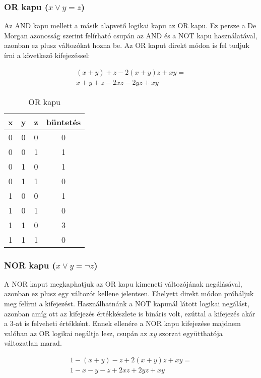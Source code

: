 \subsubsection{OR kapu ($x \vee y = z$)}

Az AND kapu mellett a másik alapvető logikai kapu az OR kapu. Ez persze a De Morgan azonosság szerint felírható csupán az AND és a NOT kapu használatával, azonban ez plusz változókat hozna be. Az OR kaput direkt módon is fel tudjuk írni a következő kifejezéssel: 

\begin{align}
	(x+y)+z-2(x+y)z+xy = \\
	x+y+z-2xz-2yz+xy
\end{align}

\begin{table}[ht]
	\footnotesize
	\centering
	\begin{tabular}{ c c c c }
		\toprule
		x & y & z & büntetés \\
		\midrule
		0 & 0 & 0 & 0 \\
		0 & 0 & 1 & 1 \\
		0 & 1 & 0 & 1 \\
		0 & 1 & 1 & 0 \\
		1 & 0 & 0 & 1 \\
		1 & 0 & 1 & 0 \\
		1 & 1 & 0 & 3 \\
		1 & 1 & 1 & 0 \\		
		\bottomrule
	\end{tabular}
	\caption{OR kapu}
	\label{tab:ORgate}
\end{table}

\subsubsection{NOR kapu ($x \vee y = \neg z$)}

A NOR kaput megkaphatjuk az OR kapu kimeneti változójának negálásával, azonban ez plusz egy változót kellene jelentsen. Ehelyett direkt módon próbáljuk meg felírni a kifejezést. Használhatnánk a NOT kapunál látott logikai negálást, azonban amíg ott az kifejezés értékkészlete is bináris volt, ezúttal a kifejezés akár a $3$-at is felveheti értékként. Ennek ellenére a NOR kapu kifejezése majdnem valóban az OR logikai negáltja lesz, csupán az $xy$ szorzat együtthatója változatlan marad.


\begin{align}
	1-(x+y)-z+2(x+y)z+xy = \\
	 1-x-y-z+2xz+2yz+xy
\end{align}

